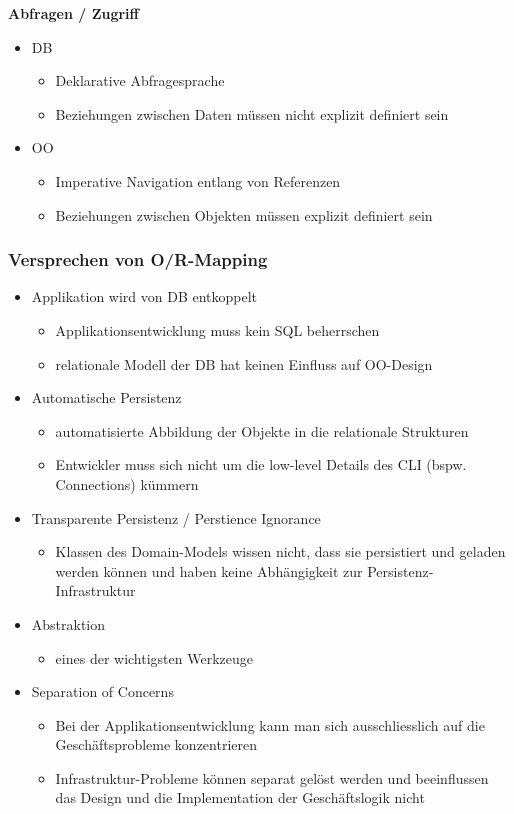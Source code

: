 \documentclass{report}
\theoremstyle{definition}
\theoremstyle{example}
\begin{document}
\textbf{Abfragen / Zugriff}
\begin{itemize}
	\item {DB
		\begin{itemize}
			\item Deklarative Abfragesprache
			\item Beziehungen zwischen Daten müssen nicht explizit definiert sein
		\end{itemize}
	}
	\item {OO
		\begin{itemize}
			\item Imperative Navigation entlang von Referenzen
			\item Beziehungen zwischen Objekten müssen explizit definiert sein
		\end{itemize}
	}
\end{itemize}

\subsubsection{Versprechen von O/R-Mapping}
\begin{itemize}
	\item {Applikation wird von DB entkoppelt
		\begin{itemize}
			\item Applikationsentwicklung muss kein SQL beherrschen
			\item relationale Modell der DB hat keinen Einfluss auf OO-Design
		\end{itemize}
	}
	\item {Automatische Persistenz
		\begin{itemize}
			\item automatisierte Abbildung der Objekte in die relationale Strukturen
			\item Entwickler muss sich nicht um die low-level Details des CLI (bspw. Connections) kümmern
		\end{itemize}
	}
	\item {Transparente Persistenz / Perstience Ignorance
		\begin{itemize}
			\item  Klassen des Domain-Models wissen nicht, dass sie persistiert und geladen werden können und haben keine Abhängigkeit zur Persistenz-Infrastruktur
		\end{itemize}
	}
	\item {Abstraktion
		\begin{itemize}
			\item eines der wichtigsten Werkzeuge
		\end{itemize}
	}
	\item {Separation of Concerns
		\begin{itemize}
			\item Bei der Applikationsentwicklung kann man sich ausschliesslich auf die Geschäftsprobleme konzentrieren
			\item Infrastruktur-Probleme können separat gelöst werden und beeinflussen das Design und die Implementation der Geschäftslogik nicht
		\end{itemize}
	}
\end{itemize}
\end{document}
